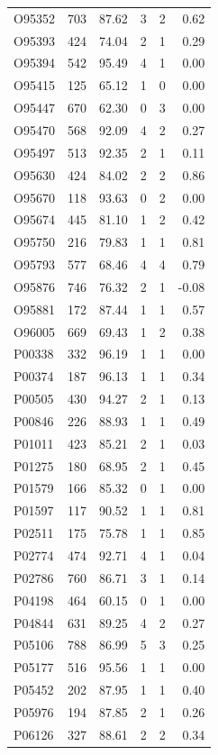 \begin{longtable}{lrrrrr}
O95352 & 703 & 87.62 & 3 & 2 & 0.62 \\
O95393 & 424 & 74.04 & 2 & 1 & 0.29 \\
O95394 & 542 & 95.49 & 4 & 1 & 0.00 \\
O95415 & 125 & 65.12 & 1 & 0 & 0.00 \\
O95447 & 670 & 62.30 & 0 & 3 & 0.00 \\
O95470 & 568 & 92.09 & 4 & 2 & 0.27 \\
O95497 & 513 & 92.35 & 2 & 1 & 0.11 \\
O95630 & 424 & 84.02 & 2 & 2 & 0.86 \\
O95670 & 118 & 93.63 & 0 & 2 & 0.00 \\
O95674 & 445 & 81.10 & 1 & 2 & 0.42 \\
O95750 & 216 & 79.83 & 1 & 1 & 0.81 \\
O95793 & 577 & 68.46 & 4 & 4 & 0.79 \\
O95876 & 746 & 76.32 & 2 & 1 & -0.08 \\
O95881 & 172 & 87.44 & 1 & 1 & 0.57 \\
O96005 & 669 & 69.43 & 1 & 2 & 0.38 \\
P00338 & 332 & 96.19 & 1 & 1 & 0.00 \\
P00374 & 187 & 96.13 & 1 & 1 & 0.34 \\
P00505 & 430 & 94.27 & 2 & 1 & 0.13 \\
P00846 & 226 & 88.93 & 1 & 1 & 0.49 \\
P01011 & 423 & 85.21 & 2 & 1 & 0.03 \\
P01275 & 180 & 68.95 & 2 & 1 & 0.45 \\
P01579 & 166 & 85.32 & 0 & 1 & 0.00 \\
P01597 & 117 & 90.52 & 1 & 1 & 0.81 \\
P02511 & 175 & 75.78 & 1 & 1 & 0.85 \\
P02774 & 474 & 92.71 & 4 & 1 & 0.04 \\
P02786 & 760 & 86.71 & 3 & 1 & 0.14 \\
P04198 & 464 & 60.15 & 0 & 1 & 0.00 \\
P04844 & 631 & 89.25 & 4 & 2 & 0.27 \\
P05106 & 788 & 86.99 & 5 & 3 & 0.25 \\
P05177 & 516 & 95.56 & 1 & 1 & 0.00 \\
P05452 & 202 & 87.95 & 1 & 1 & 0.40 \\
P05976 & 194 & 87.85 & 2 & 1 & 0.26 \\
P06126 & 327 & 88.61 & 2 & 2 & 0.34 \\

\end{longtable}
